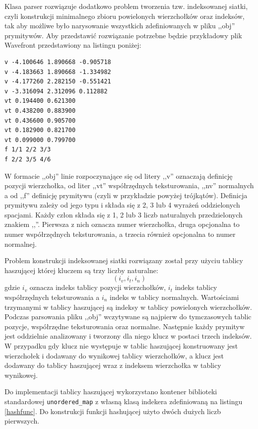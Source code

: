 {Klasa parser rozwiązuje dodatkowo problem tworzenia tzw. indeksowanej siatki,
czyli konstrukcji minimalnego zbioru powielonych wierzchołków oraz indeksów, tak aby możliwe
było narysowanie wszystkich zdefiniowanych w pliku ,,obj'' prymitywów. Aby
przedstawić rozwiązanie potrzebne będzie przykładowy plik Wavefront
przedstawiony na listingu poniżej:

\begin{lstlisting}[caption=Fragment pliku OBJ, label=obj_file]
v -4.100646 1.890668 -0.905718
v -4.183663 1.890668 -1.334982
v -4.177260 2.282150 -0.551421
v -3.316094 2.312096 0.112882
vt 0.194400 0.621300
vt 0.438200 0.883900
vt 0.436600 0.905700
vt 0.182900 0.821700
vt 0.099000 0.799700
f 1/1 2/2 3/3
f 2/2 3/5 4/6
\end{lstlisting}

W formacie ,,obj'' linie rozpoczynające się od litery ,,v'' oznaczają definicję
	pozycji wierzchołka, od liter ,,vt'' współrzędnych teksturowania, ,,nv''
	normalnych a od ,,f''
	definicję prymitywu (czyli w przykładzie powyżej trójkątów). Definicja
	prymitywu zależy od jego typu i składa się z 2, 3 lub 4 wyrażeń oddzielonych
	spacjami. Każdy człon składa się z 1, 2 lub 3 liczb naturalnych przedzielonych znakiem
	,,\/''. Pierwsza z nich oznacza numer wierzchołka, druga opcjonalna to numer
	współrzędnych teksturowania, a trzecia również opcjonalna to numer
	normalnej.
	
Problem konstrukcji indeksowanej siatki rozwiązany został przy użyciu tablicy
haszującej której kluczem są trzy liczby naturalne:
$$ (i_v, i_t, i_n) $$
gdzie $i_v$ oznacza indeks tablicy pozycji wierzchołków, $i_t$ indeks
tablicy współrzędnych
teksturowania a $i_n$ indeks w tablicy normalnych. Wartościami trzymanymi w
tablicy haszującej są indeksy w tablicy powielonych wierzchołków. Podczas parsowania pliku
,,obj'' wczytywane są najpierw do tymczasowych tablic pozycje, współrzędne
teksturowania oraz normalne. Następnie każdy prymityw jest oddzielnie analizowany
i tworzony dla niego klucz w postaci trzech indeksów. W przypadku gdy klucz nie
występuje w tablic haszującej konstruowany jest wierzchołek i dodawany do
wynikowej tablicy wierzchołków, a klucz jest dodawany do tablicy haszującej
wraz z indeksem wierzchołka w tablicy wynikowej. 

Do implementacji tablicy haszującej wykorzystano kontener biblioteki
standardowej \texttt{unordered\_map} z własną klasą indekera zdefiniowaną na
listingu \ref{hashfunc}. Do konstrukcji funkcji hashującej użyto dwóch dużych
liczb pierwszych.

}
